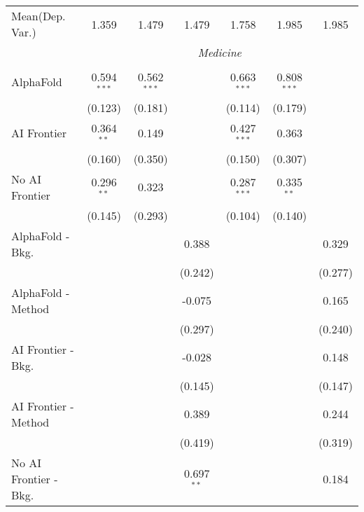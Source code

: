 \begin{tabular}{lcccccc}
Mean(Dep. Var.) & 1.359 & 1.479 & 1.479 & 1.758 & 1.985 & 1.985 \\
 & \multicolumn{6}{c}{\textit{Medicine}} \\ \\
   AlphaFold               & 0.594$^{***}$ & 0.562$^{***}$ &              & 0.663$^{***}$ & 0.808$^{***}$ &   \\   
                           & (0.123)       & (0.181)       &              & (0.114)       & (0.179)       &   \\   
   AI Frontier             & 0.364$^{**}$  & 0.149         &              & 0.427$^{***}$ & 0.363         &   \\   
                           & (0.160)       & (0.350)       &              & (0.150)       & (0.307)       &   \\   
   No AI Frontier          & 0.296$^{**}$  & 0.323         &              & 0.287$^{***}$ & 0.335$^{**}$  &   \\   
                           & (0.145)       & (0.293)       &              & (0.104)       & (0.140)       &   \\   
   AlphaFold - Bkg.        &               &               & 0.388        &               &               & 0.329\\   
                           &               &               & (0.242)      &               &               & (0.277)\\   
   AlphaFold - Method      &               &               & -0.075       &               &               & 0.165\\   
                           &               &               & (0.297)      &               &               & (0.240)\\   
   AI Frontier - Bkg.      &               &               & -0.028       &               &               & 0.148\\   
                           &               &               & (0.145)      &               &               & (0.147)\\   
   AI Frontier - Method    &               &               & 0.389        &               &               & 0.244\\   
                           &               &               & (0.419)      &               &               & (0.319)\\   
   No AI Frontier - Bkg.   &               &               & 0.697$^{**}$ &               &               & 0.184\\   

\end{tabular}
